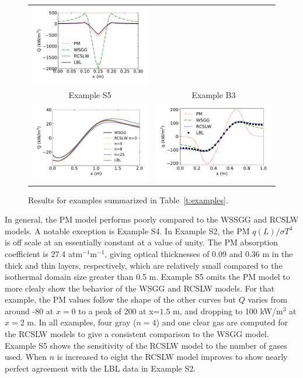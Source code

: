 \documentclass[preprint,12pt, a4paper]{elsarticle}
\begin{document}
\begin{figure}
\begin{center}
\begin{tabular}{c c}
        \includegraphics[width=3 in]{ex_4a.pdf} \\
        Example S5 & Example B3 \\
        \includegraphics[width=3 in]{ex_5b.pdf} &
        \includegraphics[width=3 in]{ex_6.pdf}
    \end{tabular}
    \caption{Results for examples summarized in Table~\ref{t:examples}.}
    \label{f:examples}
    \end{center}
\end{figure}
%
In general, the PM model performs poorly compared to the WSSGG and RCSLW models. A notable exception is Example S4. In Example S2, the PM $q(L)/\sigma T^4$ is off scale at an essentially constant at a value of unity. The PM absorption coefficient is 27.4 atm$^{-1}$m$^{-1}$, giving optical thicknesses of 0.09 and 0.36 m in the thick and thin layers, respectively, which are relatively small compared to the isothermal domain size greater than 0.5 m. Example S5 omits the PM model to more clealy show the behavior of the WSGG and RCSLW models. For that example, the PM values follow the shape of the other curves but $Q$ varies from around -80 at $x=0$ to a peak of 200 at x=$1.5$ m, and dropping to 100 kW/m$^3$ at $x=2$ m. In all examples, four gray ($n=4$) and one clear gas are computed for the RCSLW models to give a consistent comparison to the WSGG model. Example S5 shows the sensitivity of the RCSLW model to the number of gases used. When $n$ is increased to eight the RCSLW model improves to show nearly perfect agreement with the LBL data in Example S2.
\end{document}
